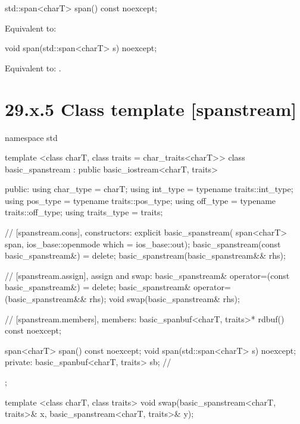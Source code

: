 \documentclass[ebook,11pt,article]{memoir}
\renewcommand{\iref}[1]{[#1]}
\begin{document}
\begin{itemdecl}
std::span<charT> span() const noexcept;
\end{itemdecl}

\begin{itemdescr}
\pnum
\effects Equivalent to: \\
\end{itemdescr}

\begin{itemdecl}
void span(std::span<charT> s) noexcept;
\end{itemdecl}

\begin{itemdescr}
\pnum
\effects
Equivalent to:
.
\end{itemdescr}

\section{29.x.5 Class template  [spanstream] }

\begin{codeblock}
namespace std {
  template <class charT, class traits = char_traits<charT>>
  class basic_spanstream
    : public basic_iostream<charT, traits> {
  public:
    using char_type      = charT;
    using int_type       = typename traits::int_type;
    using pos_type       = typename traits::pos_type;
    using off_type       = typename traits::off_type;
    using traits_type    = traits;

    // \iref{spanstream.cons}, constructors:
    explicit basic_spanstream(
      span<charT> span,
      ios_base::openmode which = ios_base::out);
    basic_spanstream(const basic_spanstream&) = delete;
    basic_spanstream(basic_spanstream&& rhs);

    // \iref{spanstream.assign}, assign and swap:
    basic_spanstream& operator=(const basic_spanstream&) = delete;
    basic_spanstream& operator=(basic_spanstream&& rhs);
    void swap(basic_spanstream& rhs);

    // \iref{spanstream.members}, members:
    basic_spanbuf<charT, traits>* rdbuf() const noexcept;

    span<charT> span() const noexcept;
    void span(std::span<charT> s) noexcept;
  private:
    basic_spanbuf<charT, traits> sb; // \expos
  };

  template <class charT, class traits>
    void swap(basic_spanstream<charT, traits>& x,
              basic_spanstream<charT, traits>& y);
}
\end{codeblock}
\end{document}
